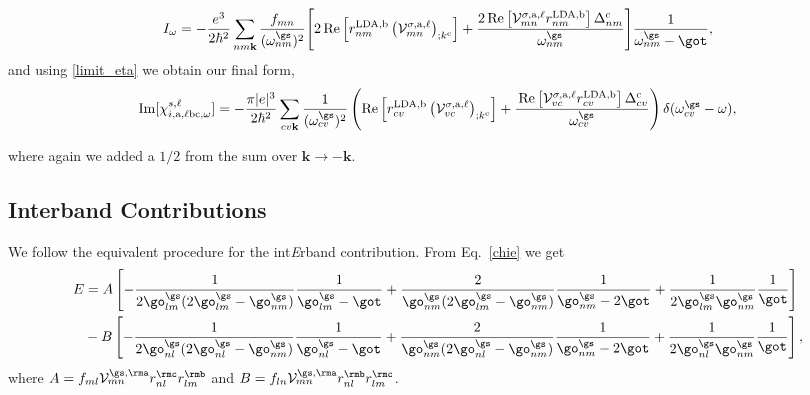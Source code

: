 \begin{equation}\label{wchii_simplified}
I_{\omega}
=   -\frac{e^3}{2\hbar^2}\sum_{nm\mathbf{k}}
    \frac{f_{mn}}{(\omega^{\gs}_{nm})^{2}}
\Biggl[
    2\,\mathrm{Re}\left[r^{\text{LDA,b}}_{nm}
    \left(\mathcal{V}^{\sigma,\text{a},\ell}_{mn}\right)_{;k^{\text{c}}}\right]
+   \frac{2\,\mathrm{Re}\left[\mathcal{V}^{\sigma,\text{a},\ell}_{mn}
    r^{\text{LDA,b}}_{nm}\right]\Delta^{\text{c}}_{nm}}{\omega^{\gs}_{nm}} 
\Biggr]\frac{1}{\omega^{\gs}_{nm}-\got}
,
\end{equation}
and using \eqref{limit_eta} we obtain our final form,
\begin{equation}
\mathrm{Im}[\chi_{i,\text{a},\ell\text{b}\text{c},\omega}^{s,\ell}]
=   -\frac{\pi\vert e\vert^3}{2\hbar^2}
    \sum_{cv\mathbf{k}}\frac{1}{(\omega^{\gs}_{cv})^{2}}
\left(
    \mathrm{Re}\left[r^{\text{LDA,b}}_{cv}
    \left(\mathcal{V}^{\sigma,\text{a},\ell}_{vc}\right)_{;k^{\text{c}}}\right]
+   \frac{\,\mathrm{Re}\left[\mathcal{V}^{\sigma,\text{a},\ell}_{vc}
    r^{\text{LDA,b}}_{cv}\right]\Delta^{\text{c}}_{cv}}{\omega^{\gs}_{cv}} 
\right)\delta(\omega^{\gs}_{cv}-\omega)
,
\end{equation}

where again we added a $1/2$ from the sum over 
$\mathbf{k} \rightarrow - \mathbf{k}$.

\subsection{Interband Contributions}

We follow the equivalent procedure for the int{\it E}rband contribution. 
From Eq.~\eqref{chie} we get
\begin{align}\label{pfe}  
E&=  
A
\left[
-\frac{1}{2\go^\gs_{lm}(2\go^\gs_{lm}-\go^\gs_{nm})}\frac{1}{\go^\gs_{lm}-\got}
+\frac{2}{\go^\gs_{nm}(2\go^\gs_{lm}-\go^\gs_{nm})}\frac{1}{\go^\gs_{nm}-2\got}
+\frac{1}{2\go^\gs_{lm}\go^\gs_{nm}}\frac{1}{\got}
\right]
\nonumber\\
&- 
B
\left[
-\frac{1}{2\go^\gs_{nl}(2\go^\gs_{nl}-\go^\gs_{nm})}\frac{1}{\go^\gs_{nl}-\got}
+\frac{2}{\go^\gs_{nm}(2\go^\gs_{nl}-\go^\gs_{nm})}\frac{1}{\go^\gs_{nm}-2\got}
+\frac{1}{2\go^\gs_{nl}\go^\gs_{nm}}\frac{1}{\got}
\right]
,
\end{align}  
where 
$A=f_{ml}{\cal V}^{\gs,\rma}_{mn}r^{\rmc}_{nl}r^{\rmb}_{lm}$   
and
$B=f_{ln}{\cal V}^{\gs,\rma}_{mn}r^{\rmb}_{nl}r^{\rmc}_{lm}$.

